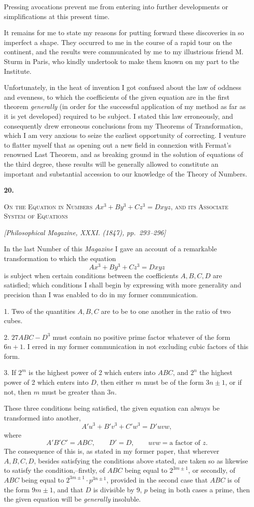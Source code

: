 \documentclass[11pt]{article}
\newcommand{\paperhead}[3]{%
  \clearpage
  \begin{center}
  {\Large\bfseries #1.}\par\vspace{0.85em}
  {\large\scshape #2}\par\vspace{0.6em}
  {\itshape [#3]}\par
  \end{center}\vspace{0.4em}}
\newcommand{\sourcepage}[1]{\marginpar{\scriptsize p.~#1}}
\begin{document}
{{Pressing avocations prevent me from entering into further developments or simplifications at this present time.

It remains for me to state my reasons for putting forward these discoveries in so imperfect a shape. They occurred to me in the course of a rapid tour on the continent, and the results were communicated by me to my illustrious friend M. Sturm in Paris, who kindly undertook to make them known on my part to the Institute.

Unfortunately, in the heat of invention I got confused about the law of oddness and evenness, to which the coefficients of the given equation are in the first theorem \emph{generally} (in order for the successful application of my method as far as it is yet developed) required to be subject. I stated this law erroneously, and consequently drew erroneous conclusions from my Theorems of Transformation, which I am very anxious to seize the earliest opportunity of correcting. I venture to flatter myself that as opening out a new field in connexion with Fermat's renowned Last Theorem, and as breaking ground in the solution of equations of the third degree, these results will be generally allowed to constitute an important and substantial accession to our knowledge of the Theory of Numbers.

\paperhead{20}{On the Equation in Numbers $Ax^3+By^3+Cz^3=Dxyz$, and its Associate System of Equations}{Philosophical Magazine, XXXI. (1847), pp.~293--296}

\sourcepage{110}
In the last Number of this \emph{Magazine} I gave an account of a remarkable transformation to which the equation
\[
Ax^3+By^3+Cz^3=Dxyz
\]
is subject when certain conditions between the coefficients $A,B,C,D$ are satisfied; which conditions I shall begin by expressing with more generality and precision than I was enabled to do in my former communication.

1. Two of the quantities $A,B,C$ are to be to one another in the ratio of two cubes.

2. $27ABC-D^3$ must contain no positive prime factor whatever of the form $6n+1$. I erred in my former communication in not excluding cubic factors of this form.

3. If $2^m$ is the highest power of 2 which enters into $ABC$, and $2^n$ the highest power of 2 which enters into $D$, then either $m$ must be of the form $3n\pm1$, or if not, then $m$ must be greater than $3n$.

These three conditions being satisfied, the given equation can always be transformed into another,
\[
A'u^3+B'v^3+C'w^3=D'uvw,
\]
where
\[
A'B'C'=ABC,\qquad D'=D,\qquad uvw=\text{a factor of }z.
\]
The consequence of this is, as stated in my former paper, that wherever $A,B,C,D$, besides satisfying the conditions above stated, are taken so as likewise to satisfy the condition,--firstly, of $ABC$ being equal to $2^{3m\pm1}$, or secondly, of $ABC$ being equal to $2^{3m\pm1}\cdot p^{3n\pm1}$, provided in the second case that $ABC$ is of the form $9m\pm1$, and that $D$ is divisible by 9, $p$ being in both cases a prime, then the given equation will be \emph{generally} insoluble.

}}
\end{document}
